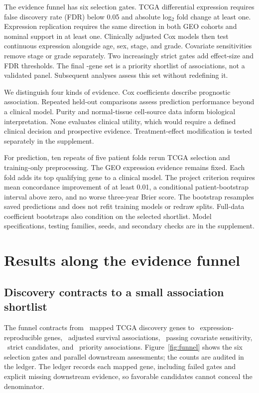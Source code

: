 \documentclass{article}
\begin{document}
The evidence funnel has six selection gates. TCGA differential expression requires false discovery rate (FDR) below 0.05 and absolute log$_2$ fold change at least one. Expression replication requires the same direction in both GEO cohorts and nominal support in at least one. Clinically adjusted Cox models then test continuous expression alongside age, sex, stage, and grade. Covariate sensitivities remove stage or grade separately. Two increasingly strict gates add effect-size and FDR thresholds. The final \HighGenes-gene set is a priority shortlist of associations, not a validated panel. Subsequent analyses assess this set without redefining it.

We distinguish four kinds of evidence. Cox coefficients describe prognostic association. Repeated held-out comparisons assess prediction performance beyond a clinical model. Purity and normal-tissue cell-source data inform biological interpretation. None evaluates clinical utility, which would require a defined clinical decision and prospective evidence. Treatment-effect modification is tested separately in the supplement.

For prediction, ten repeats of five patient folds rerun TCGA selection and training-only preprocessing. The GEO expression evidence remains fixed. Each fold adds its top qualifying gene to a clinical model. The project criterion requires mean concordance improvement of at least 0.01, a conditional patient-bootstrap interval above zero, and no worse three-year Brier score. The bootstrap resamples saved predictions and does not refit training models or redraw splits. Full-data coefficient bootstraps also condition on the selected shortlist. Model specifications, testing families, seeds, and secondary checks are in the supplement.

\section{Results along the evidence funnel}
\subsection{Discovery contracts to a small association shortlist}
The funnel contracts from \MappedDeg\ mapped TCGA discovery genes to \ReproDeg\ expression-reproducible genes, \MainSurvival\ adjusted survival associations, \SensitivityPass\ passing covariate sensitivity, \StrictGenes\ strict candidates, and \HighGenes\ priority associations. Figure~\ref{fig:funnel} shows the six selection gates and parallel downstream assessments; the counts are audited in the ledger. The ledger records each mapped gene, including failed gates and explicit missing downstream evidence, so favorable candidates cannot conceal the denominator.
\end{document}
